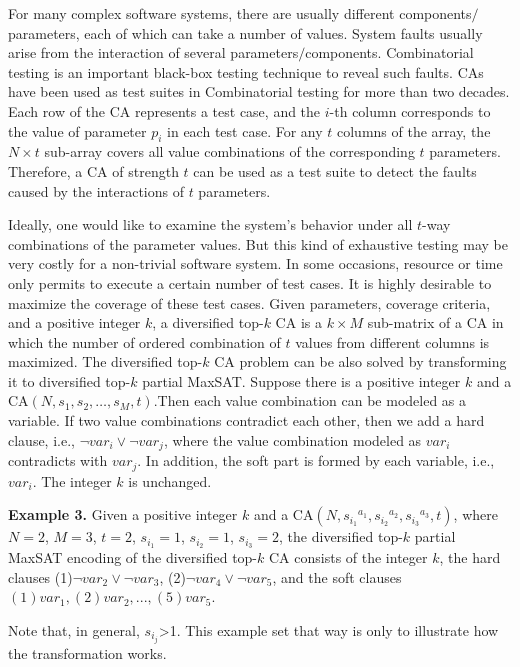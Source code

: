 \documentclass{llncs}
\begin{document}
For many complex software systems, there are usually different components$/$ parameters, each of which can take a number of values. System faults usually arise from the interaction of several parameters$/$components. Combinatorial testing \cite{lin_2015,kuhn_2002,AETG_TSE97,KWG04,Nie_CSvy11} is an important black-box testing technique to reveal such faults. CAs have been used as test suites in Combinatorial testing for more than two decades. Each row of the CA represents a test case, and the $i$-th column corresponds to the value of parameter $p_i$ in each test case. For any $t$ columns of the array, the $N\times t$ sub-array covers all value combinations of the corresponding $t$ parameters. Therefore, a CA of strength $t$ can be used as a test suite to detect the faults caused by the interactions of $t$ parameters.

Ideally, one would like to examine the system's behavior under all $t$-way combinations of the parameter values. But this kind of exhaustive testing may be very costly for a non-trivial software system. In some occasions, resource or time only permits to execute a certain number of test cases. It is highly desirable to maximize the coverage of these test cases. Given parameters, coverage criteria, and a positive integer $k$, a diversified top-$k$ CA is a $k\times M$ sub-matrix of a CA in which the number of ordered combination of $t$ values from different columns is maximized. The diversified top-$k$ CA problem can be also solved by transforming it to diversified top-$k$ partial MaxSAT.
Suppose there is a positive integer $k$ and a CA$(N,s_1,s_2,\ldots,s_M,t)$.Then each value combination can be modeled as a variable. If two value combinations contradict each other, then we add a hard clause, i.e., $\neg var_i \vee \neg var_j$, where the value combination modeled as $var_i$ contradicts with $var_j$. In addition, the soft part is formed by each variable, i.e., $var_i$. The integer $k$ is unchanged.

\medskip\noindent
{\bfseries Example 3.} Given a positive integer $k$ and a CA$(N,{s_{i_1}}^{a_1},{s_{i_2}}^{a_2}, {s_{i_3}}^{a_3},t)$, where $N=2$, $M=3$, $t=2$, $s_{i_1}=1$, $s_{i_2}=1$, $s_{i_3}=2$, the diversified top-$k$ partial MaxSAT encoding of the diversified top-$k$ CA consists of the integer $k$, the hard clauses (1)$\neg var_2 \vee \neg var_3$, (2)$\neg var_4 \vee \neg var_5$, and the soft clauses $(1)var_1, (2)var_2,..., (5)var_{5}$.

Note that, in general, $s_{i_j}$>1. This example set that way is only to illustrate how the transformation works.
\end{document}
